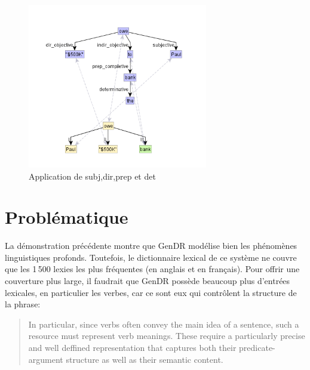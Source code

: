 \begin{figure}[htb]
	\centering
	\includegraphics[width=0.7\textwidth, trim = {0cm 0cm 0cm 0cm},clip]{ch3/figs/rsynts_syntactisation.png}
	\caption{Application de subj,dir,prep et det}
	\label{fig:syntsurf}
\end{figure}


\section{Problématique}\label{problema}

La démonstration précédente montre que GenDR modélise bien les phénomènes linguistiques profonds. Toutefois, le dictionnaire lexical de ce système ne couvre que les 1\,500 lexies les plus fréquentes (en anglais et en français). Pour offrir une couverture plus large, il faudrait que GenDR possède beaucoup plus d'entrées lexicales, en particulier les verbes, car ce sont eux qui contrôlent la structure de la phrase:

\begin{quote}
In particular, since verbs often convey the main idea of a sentence, such a resource must represent verb meanings. These require a particularly precise and well deffined representation that captures both their predicate-argument structure as well as their semantic content.
\end{quote}
\vspace{-\baselineskip}
\hfill
\cite{SchulerVerbnetBroadcoverageComprehensive2005}

